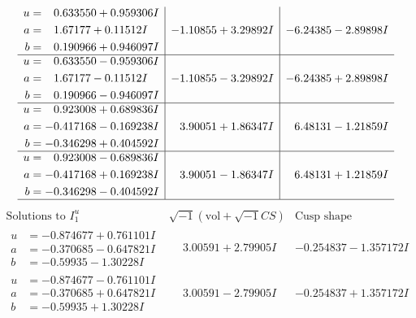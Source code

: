\documentclass[1p]{elsarticle_modified}
\theoremstyle{definition}
\newcommand{\I}{\sqrt{-1}}
\begin{document}
$$\begin{array}{c|c|c}
\begin{aligned}
u &= \phantom{-}0.633550 + 0.959306 I \\
a &= \phantom{-}1.67177 + 0.11512 I \\
b &= \phantom{-}0.190966 + 0.946097 I\end{aligned}
 & -1.10855 + 3.29892 I & -6.24385 - 2.89898 I \\ \hline\begin{aligned}
u &= \phantom{-}0.633550 - 0.959306 I \\
a &= \phantom{-}1.67177 - 0.11512 I \\
b &= \phantom{-}0.190966 - 0.946097 I\end{aligned}
 & -1.10855 - 3.29892 I & -6.24385 + 2.89898 I \\ \hline\begin{aligned}
u &= \phantom{-}0.923008 + 0.689836 I \\
a &= -0.417168 - 0.169238 I \\
b &= -0.346298 + 0.404592 I\end{aligned}
 & \phantom{-}3.90051 + 1.86347 I & \phantom{-}6.48131 - 1.21859 I \\ \hline\begin{aligned}
u &= \phantom{-}0.923008 - 0.689836 I \\
a &= -0.417168 + 0.169238 I \\
b &= -0.346298 - 0.404592 I\end{aligned}
 & \phantom{-}3.90051 - 1.86347 I & \phantom{-}6.48131 + 1.21859 I\\
 \hline 
 \end{array}$$\newpage$$\begin{array}{c|c|c}  
\text{Solutions to }I^u_{1}& \I (\text{vol} + \sqrt{-1}CS) & \text{Cusp shape}\\
 \hline 
\begin{aligned}
u &= -0.874677 + 0.761101 I \\
a &= -0.370685 - 0.647821 I \\
b &= -0.59935 - 1.30228 I\end{aligned}
 & \phantom{-}3.00591 + 2.79905 I & -0.254837 - 1.357172 I \\ \hline\begin{aligned}
u &= -0.874677 - 0.761101 I \\
a &= -0.370685 + 0.647821 I \\
b &= -0.59935 + 1.30228 I\end{aligned}
 & \phantom{-}3.00591 - 2.79905 I & -0.254837 + 1.357172 I \\ \hline\begin{aligned}

\end{aligned}
\end{array}$$
\end{document}
